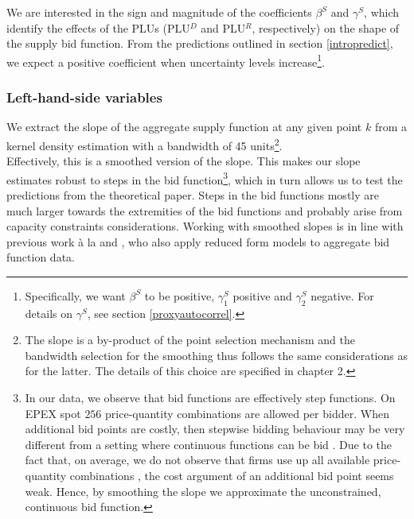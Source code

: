 We are interested in the sign and magnitude of the coefficients $\beta^S$ and $\gamma^S$, which identify the effects of the PLUs (PLU$^D$ and PLU$^R$, respectively) on the shape of the supply bid function. From the predictions outlined in section \ref{intropredict}, we expect a positive coefficient when uncertainty levels increase\footnote{Specifically, we want $\beta^S$ to be positive, $\gamma^S_1$ positive and $\gamma^S_2$ negative. For details on $\gamma^S$, see section \ref{proxyautocorrel}.}.\\ %




\subsubsection{Left-hand-side variables}
\label{LHS}
We extract the slope of the aggregate supply function at any given point $k$ from a kernel density estimation with a bandwidth of 45 units\footnote{The
slope is a by-product of the point selection mechanism and the bandwidth selection for the smoothing thus follows the same considerations as for the latter. The details of this choice are specified in chapter 2.}.  \\

Effectively, this is a smoothed version of the slope. This makes our slope estimates robust to steps in the bid function\footnote{In our data, we observe that bid functions are effectively step functions. On EPEX spot $256$ price-quantity combinations are allowed per bidder. When additional bid points are costly, then stepwise bidding behaviour may be very different from a setting where continuous functions can be bid \cite{kastl2011discrete}. Due to the fact that, on average, we do not observe that firms use up all available price-quantity combinations , the cost argument of an additional bid point seems weak. Hence, by smoothing the slope we approximate the unconstrained, continuous bid function. }, which in turn allows us to test the predictions from the theoretical paper. 
Steps in the bid functions mostly are much larger towards the extremities of the bid functions and probably arise from capacity constraints considerations. 
Working with smoothed slopes is  in line with previous work \`{a} la \cite{pw2002etude} and \cite{ozcan2004logistic}, who also apply reduced form models to aggregate bid function data. 


